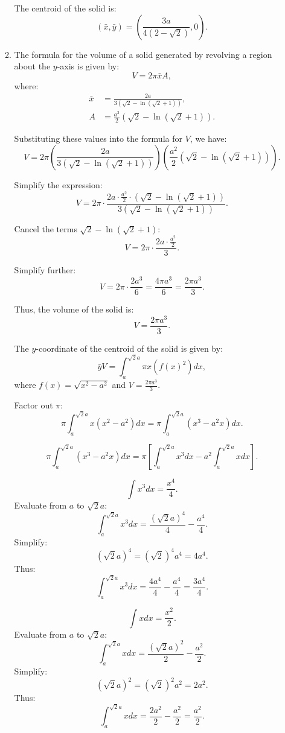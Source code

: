\documentclass[12pt]{article}
\begin{document}
\begin{enumerate}
\begin{enumerate}
The centroid of the solid is:
\[
(\bar{x}, \bar{y}) = \left( \frac{3a}{4(2 - \sqrt{2})}, 0 \right).
\]

\item 
The formula for the volume of a solid generated by revolving a region about the $y$-axis is given by:
\[
V = 2 \pi \bar{x} A,
\]
where:
\begin{align*}
\bar{x} &= \frac{2a}{3 \left( \sqrt{2} - \ln(\sqrt{2} + 1) \right)}, \\
A &= \frac{a^2}{2} \left( \sqrt{2} - \ln(\sqrt{2} + 1) \right).
\end{align*}

Substituting these values into the formula for $V$, we have:
\[
V = 2 \pi \left( \frac{2a}{3 \left( \sqrt{2} - \ln(\sqrt{2} + 1) \right)} \right) \left( \frac{a^2}{2} \left( \sqrt{2} - \ln(\sqrt{2} + 1) \right) \right).
\]

Simplify the expression:
\[
V = 2 \pi \cdot \frac{2a \cdot \frac{a^2}{2} \cdot \left( \sqrt{2} - \ln(\sqrt{2} + 1) \right)}{3 \left( \sqrt{2} - \ln(\sqrt{2} + 1) \right)}.
\]

Cancel the terms $\sqrt{2} - \ln(\sqrt{2} + 1)$:
\[
V = 2 \pi \cdot \frac{2a \cdot \frac{a^2}{2}}{3}.
\]

Simplify further:
\[
V = 2 \pi \cdot \frac{2a^3}{6} = \frac{4 \pi a^3}{6} = \frac{2 \pi a^3}{3}.
\]

Thus, the volume of the solid is:
\[
V = \frac{2 \pi a^3}{3}.
\]

The $y$-coordinate of the centroid of the solid is given by:
\[
\bar{y} V = \int_a^{\sqrt{2}a} \pi x \left( f(x)^2 \right) dx,
\]
where $f(x) = \sqrt{x^2 - a^2}$ and $V = \frac{2 \pi a^3}{3}$.



Factor out $\pi$:
\[
\pi \int_a^{\sqrt{2}a} x \left( x^2 - a^2 \right) dx = \pi \int_a^{\sqrt{2}a} \left( x^3 - a^2x \right) dx.
\]


\[
\pi \int_a^{\sqrt{2}a} \left( x^3 - a^2x \right) dx = \pi \left[ \int_a^{\sqrt{2}a} x^3 dx - a^2 \int_a^{\sqrt{2}a} x dx \right].
\]

\[
\int x^3 dx = \frac{x^4}{4}.
\]
Evaluate from $a$ to $\sqrt{2}a$:
\[
\int_a^{\sqrt{2}a} x^3 dx = \frac{(\sqrt{2}a)^4}{4} - \frac{a^4}{4}.
\]
Simplify:
\[
(\sqrt{2}a)^4 = (\sqrt{2})^4 a^4 = 4a^4.
\]
Thus:
\[
\int_a^{\sqrt{2}a} x^3 dx = \frac{4a^4}{4} - \frac{a^4}{4} = \frac{3a^4}{4}.
\]

\[
\int x dx = \frac{x^2}{2}.
\]
Evaluate from $a$ to $\sqrt{2}a$:
\[
\int_a^{\sqrt{2}a} x dx = \frac{(\sqrt{2}a)^2}{2} - \frac{a^2}{2}.
\]
Simplify:
\[
(\sqrt{2}a)^2 = (\sqrt{2})^2 a^2 = 2a^2.
\]
Thus:
\[
\int_a^{\sqrt{2}a} x dx = \frac{2a^2}{2} - \frac{a^2}{2} = \frac{a^2}{2}.
\]


\end{enumerate}
\end{enumerate}
\end{document}
